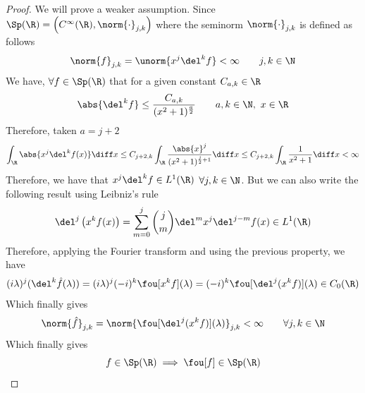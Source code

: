 \documentclass[../mmf.tex]{subfiles}
\begin{document}
\begin{proof}
	We will prove a weaker assumption. Since $\Sp(\R)=\left(C^\infty(\R),\norm{\cdot}_{j,k}\right)$ where the seminorm $\norm{\cdot}_{j,k}$ is defined as follows
	\begin{equation*}
		\norm{f}_{j,k}=\unorm{x^j\del^kf}<\infty\qquad j,k\in\N
	\end{equation*}
	We have, $\forall f\in\Sp(\R)$ that for a given constant $C_{a,k}\in\R$
	\begin{equation*}
		\abs{\del^kf}\le\frac{C_{a,k}}{(x^2+1)^{\frac{a}{2}}}\qquad a,k\in\N,\ x\in\R
	\end{equation*}
	Therefore, taken $a=j+2$
	\begin{equation*}
		\int_{\R}^{}\abs{x^j\del^kf(x)}\diff x\le C_{j+2,k}\int_{\R}^{}\frac{\abs{x}^j}{(x^2+1)^{\frac{j}{2}+1}}\diff x\le C_{j+2,k}\int_{\R}^{}\frac{1}{x^2+1}\diff x<\infty
	\end{equation*}
	Therefore, we have that $x^j\del^kf\in L^1(\R)$ $\forall j,k\in\N$. But we can also write the following result using Leibniz's rule
	\begin{equation*}
		\del^j\left( x^kf(x) \right)=\sum_{m=0}^{j}\binom{j}{m}\del^mx^j\del^{j-m}f(x)\in L^1(\R)
	\end{equation*}
	Therefore, applying the Fourier transform and using the previous property, we have
	\begin{equation*}
		(i\lambda)^j(\del^k\hat{f}(\lambda))=(i\lambda)^j(-i)^k\fou[x^kf](\lambda)=(-i)^k\fou[\del^j(x^kf)](\lambda)\in C_0(\R)
	\end{equation*}
	Which finally gives
	\begin{equation*}
		\norm{\hat{f}}_{j,k}=\norm{\fou[\del^j(x^kf)](\lambda)}_{j,k}<\infty\qquad\forall j,k\in\N
	\end{equation*}
	Which finally gives
	\begin{equation*}
		f\in\Sp(\R)\implies{}\fou[f]\in\Sp(\R)
	\end{equation*}
\end{proof}
\end{document}
